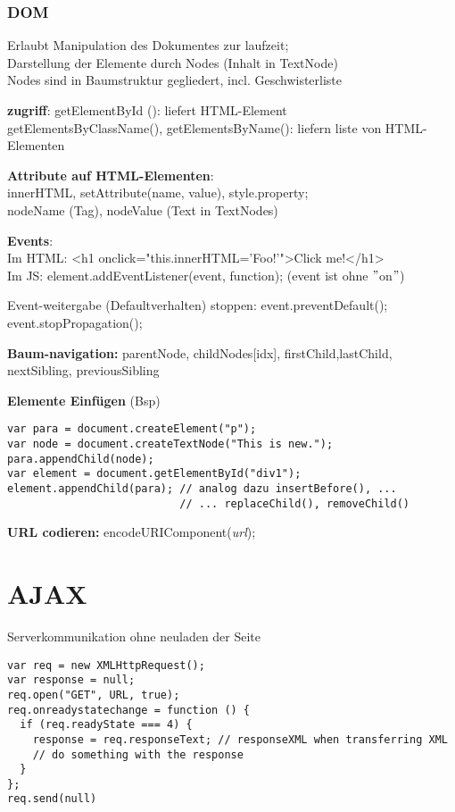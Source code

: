 \newpage

\subsubsection{DOM}
Erlaubt Manipulation des Dokumentes zur laufzeit;\\
Darstellung der Elemente durch Nodes (Inhalt in TextNode)\\
Nodes sind in Baumstruktur gegliedert, incl. Geschwisterliste

\textbf{zugriff}:
getElementById (): liefert HTML-Element\\
getElementsByClassName(), getElementsByName(): liefern liste von HTML-Elementen

\textbf{Attribute auf HTML-Elementen}:\\
innerHTML, setAttribute(name, value), style.property;\\
nodeName (Tag), nodeValue (Text in TextNodes)

\textbf{Events}: \\
Im HTML: <h1 onclick="this.innerHTML='Foo!'">Click me!</h1>\\
Im JS: element.addEventListener(event, function);    (event ist ohne  $"$on$"$)

Event-weitergabe (Defaultverhalten) stoppen:  
event.preventDefault(); event.stopPropagation();

\textbf{Baum-navigation: }
parentNode, childNodes[idx], firstChild,lastChild,
nextSibling, previousSibling

\textbf{Elemente Einfügen }(Bsp)
\begin{verbatim}
var para = document.createElement("p");
var node = document.createTextNode("This is new.");
para.appendChild(node);
var element = document.getElementById("div1");
element.appendChild(para); // analog dazu insertBefore(), ...
                           // ... replaceChild(), removeChild()
\end{verbatim}

\textbf{URL codieren:} encodeURIComponent(\textit{url});
\section{AJAX}
Serverkommunikation ohne neuladen der Seite
\begin{verbatim}
var req = new XMLHttpRequest();
var response = null;
req.open("GET", URL, true);
req.onreadystatechange = function () {
  if (req.readyState === 4) {
    response = req.responseText; // responseXML when transferring XML
    // do something with the response
  }
};
req.send(null)
\end{verbatim}

